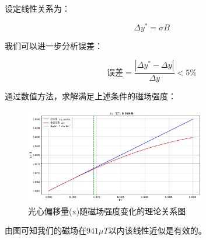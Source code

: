\documentclass[12pt]{ctexart}
\numberwithin{equation}{section} %
\begin{document}
设定线性关系为：

\[
\Delta y^* = \sigma B
\]

我们可以进一步分析误差：

\[
\text{误差} = \frac{|\Delta y^* - \Delta y|}{\Delta y}<5\%
\]

通过数值方法，求解满足上述条件的磁场强度：
\begin{figure}[H] %
    \centering %
    \includegraphics[width=0.7\textwidth]{近似区间.png} %
    \caption{光心偏移量(x)随磁场强度变化的理论关系图} %
    \label{fig:有效区间} %
\end{figure}


由图可知我们的磁场在$941\mu T$以内该线性近似是有效的。


\end{document}

